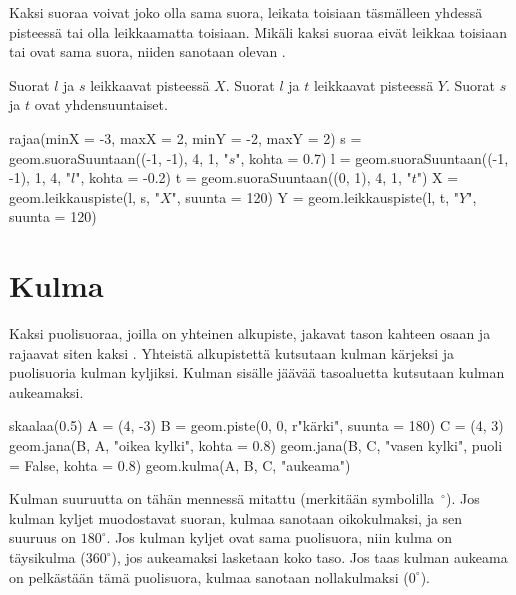 Kaksi suoraa voivat joko olla sama suora, leikata toisiaan täsmälleen yhdessä pisteessä tai olla leikkaamatta toisiaan. Mikäli kaksi suoraa eivät leikkaa toisiaan tai ovat sama suora, niiden sanotaan olevan .

\begin{esimerkki} %
Suorat $l$ ja $s$ leikkaavat pisteessä $X$. Suorat $l$ ja $t$ leikkaavat pisteessä $Y$. Suorat $s$ ja $t$ ovat yhdensuuntaiset.

\begin{center}
\begin{kuva}
	rajaa(minX = -3, maxX = 2, minY = -2, maxY = 2)
	s = geom.suoraSuuntaan((-1, -1), 4, 1, "$s$", kohta = 0.7)
	l = geom.suoraSuuntaan((-1, -1), 1, 4, "$l$", kohta = -0.2)
	t = geom.suoraSuuntaan((0, 1), 4, 1, "$t$")
	X = geom.leikkauspiste(l, s, "$X$", suunta = 120)
	Y = geom.leikkauspiste(l, t, "$Y$", suunta = 120)
\end{kuva}
\end{center}
\end{esimerkki}


\section*{Kulma}

Kaksi puolisuoraa, joilla on yhteinen alkupiste, jakavat tason kahteen osaan ja rajaavat siten kaksi . Yhteistä alkupistettä
kutsutaan kulman kärjeksi ja puolisuoria kulman kyljiksi. Kulman sisälle jäävää tasoaluetta
kutsutaan kulman aukeamaksi.

\begin{center}
\begin{kuva}
	skaalaa(0.5)
	A = (4, -3)
	B = geom.piste(0, 0, r"k\"{a}rki", suunta = 180)
	C = (4, 3)
	geom.jana(B, A, "oikea kylki", kohta = 0.8)
	geom.jana(B, C, "vasen kylki", puoli = False, kohta = 0.8)
	geom.kulma(A, B, C, "aukeama")
\end{kuva}
\end{center}

Kulman suuruutta on tähän mennessä mitattu  (merkitään symbolilla~$^{\circ}$). Jos kulman kyljet muodostavat suoran,
kulmaa sanotaan oikokulmaksi, ja sen suuruus on $180^{\circ}$.
Jos kulman kyljet ovat sama puolisuora, niin kulma on täysikulma ($360^{\circ}$), jos aukeamaksi lasketaan
koko taso. Jos taas kulman aukeama on pelkästään tämä puolisuora, kulmaa sanotaan
nollakulmaksi ($0^{\circ}$).

